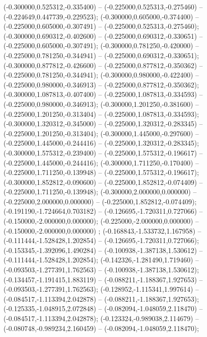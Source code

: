  (-0.300000,0.525312,-0.335400) -- (-0.225000,0.525313,-0.275460) -- (-0.224649,0.447739,-0.229523);
 (-0.300000,0.605000,-0.374400) -- (-0.225000,0.605000,-0.307491) -- (-0.225000,0.525313,-0.275460);
 (-0.300000,0.690312,-0.402600) -- (-0.225000,0.690312,-0.330651) -- (-0.225000,0.605000,-0.307491);
 (-0.300000,0.781250,-0.420000) -- (-0.225000,0.781250,-0.344941) -- (-0.225000,0.690312,-0.330651);
 (-0.300000,0.877812,-0.426600) -- (-0.225000,0.877812,-0.350362) -- (-0.225000,0.781250,-0.344941);
 (-0.300000,0.980000,-0.422400) -- (-0.225000,0.980000,-0.346913) -- (-0.225000,0.877812,-0.350362);
 (-0.300000,1.087813,-0.407400) -- (-0.225000,1.087813,-0.334593) -- (-0.225000,0.980000,-0.346913);
 (-0.300000,1.201250,-0.381600) -- (-0.225000,1.201250,-0.313404) -- (-0.225000,1.087813,-0.334593);
 (-0.300000,1.320312,-0.345000) -- (-0.225000,1.320312,-0.283345) -- (-0.225000,1.201250,-0.313404);
 (-0.300000,1.445000,-0.297600) -- (-0.225000,1.445000,-0.244416) -- (-0.225000,1.320312,-0.283345);
 (-0.300000,1.575312,-0.239400) -- (-0.225000,1.575312,-0.196617) -- (-0.225000,1.445000,-0.244416);
 (-0.300000,1.711250,-0.170400) -- (-0.225000,1.711250,-0.139948) -- (-0.225000,1.575312,-0.196617);
 (-0.300000,1.852812,-0.090600) -- (-0.225000,1.852812,-0.074409) -- (-0.225000,1.711250,-0.139948);
 (-0.300000,2.000000,0.000000) -- (-0.225000,2.000000,0.000000) -- (-0.225000,1.852812,-0.074409);
 (-0.191190,-1.724664,0.703182) -- (-0.126695,-1.720311,0.727066) -- (-0.150000,-2.000000,0.000000);
 (-0.225000,-2.000000,0.000000) -- (-0.150000,-2.000000,0.000000) ;
 (-0.168843,-1.533732,1.167958) -- (-0.111444,-1.528428,1.202854) -- (-0.126695,-1.720311,0.727066);
 (-0.153345,-1.392096,1.490284) -- (-0.100938,-1.387138,1.530612) -- (-0.111444,-1.528428,1.202854);
 (-0.142326,-1.281490,1.719460) -- (-0.093503,-1.277391,1.762563) -- (-0.100938,-1.387138,1.530612);
 (-0.134457,-1.191415,1.883119) -- (-0.088211,-1.188367,1.927653) -- (-0.093503,-1.277391,1.762563);
 (-0.128952,-1.115341,1.997614) -- (-0.084517,-1.113394,2.042878) -- (-0.088211,-1.188367,1.927653);
 (-0.125335,-1.048915,2.072848) -- (-0.082094,-1.048059,2.118470) -- (-0.084517,-1.113394,2.042878);
 (-0.123324,-0.989038,2.114679) -- (-0.080748,-0.989234,2.160459) -- (-0.082094,-1.048059,2.118470);
